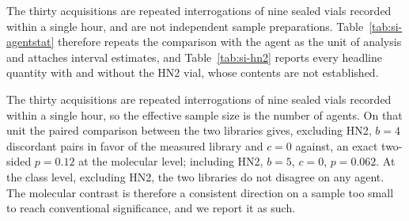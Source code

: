 \documentclass[11pt]{article}
\begin{document}
The thirty acquisitions are repeated interrogations of nine sealed vials recorded within a
single hour, and are not independent sample preparations. Table~\ref{tab:si-agentstat}
therefore repeats the comparison with the agent as the unit of analysis and attaches
interval estimates, and Table~\ref{tab:si-hn2} reports every headline quantity with and
without the HN2 vial, whose contents are not established.

\begin{table}[htbp]
\centering
\caption{Accuracy with the agent, not the acquisition, as the unit of analysis. Each agent is scored by the majority of its acquisitions; intervals are Clopper--Pearson.}
\label{tab:si-agentstat}
\footnotesize
{}

\begin{flushleft}\footnotesize The thirty acquisitions are repeated interrogations of nine sealed vials recorded within a single hour, so the effective sample size is the number of agents. On that unit the paired comparison between the two libraries gives, excluding HN2, $b = 4$ discordant pairs in favor of the measured library and $c = 0$ against, an exact two-sided $p = 0.12$ at the molecular level; including HN2, $b = 5$, $c = 0$, $p = 0.062$. At the class level, excluding HN2, the two libraries do not disagree on any agent. The molecular contrast is therefore a consistent direction on a sample too small to reach conventional significance, and we report it as such.\end{flushleft}
\end{table}
\end{document}
